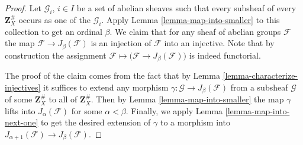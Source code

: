 \documentclass[10pt,a4paper]{amsart}
\theoremstyle{plain}
\theoremstyle{definition}
\theoremstyle{remark}
\numberwithin{equation}{subsection}
\begin{document}
\begin{proof}
Let $\mathcal{G}_i$, $i \in I$ be a set of abelian
sheaves such that every subsheaf of every $\mathbf{Z}_X^\#$
occurs as one of the $\mathcal{G}_i$. Apply
Lemma \ref{lemma-map-into-smaller} to this collection to
get an ordinal $\beta$. We claim that for any sheaf of abelian
groups $\mathcal{F}$ the map $\mathcal{F} \to J_\beta(\mathcal{F})$
is an injection of $\mathcal{F}$ into an injective.
Note that by construction the assignment
$\mathcal{F} \mapsto \big(\mathcal{F} \to J_\beta(\mathcal{F})\big)$
is indeed functorial.

\medskip\noindent
The proof of the claim comes from the fact that by
Lemma \ref{lemma-characterize-injectives} it suffices to extend any
morphism $\gamma : \mathcal{G} \to J_\beta(\mathcal{F})$
from a subsheaf $\mathcal{G}$ of some $\mathbf{Z}_X^\#$ to all of
$\mathbf{Z}_X^\#$. Then by Lemma \ref{lemma-map-into-smaller} the
map $\gamma$ lifts into $J_\alpha(\mathcal{F})$ for some
$\alpha < \beta$. Finally, we apply Lemma \ref{lemma-map-into-next-one}
to get the desired extension of $\gamma$ to a morphism
into $J_{\alpha + 1}(\mathcal{F}) \to J_\beta(\mathcal{F})$.
\end{proof}
\end{document}
